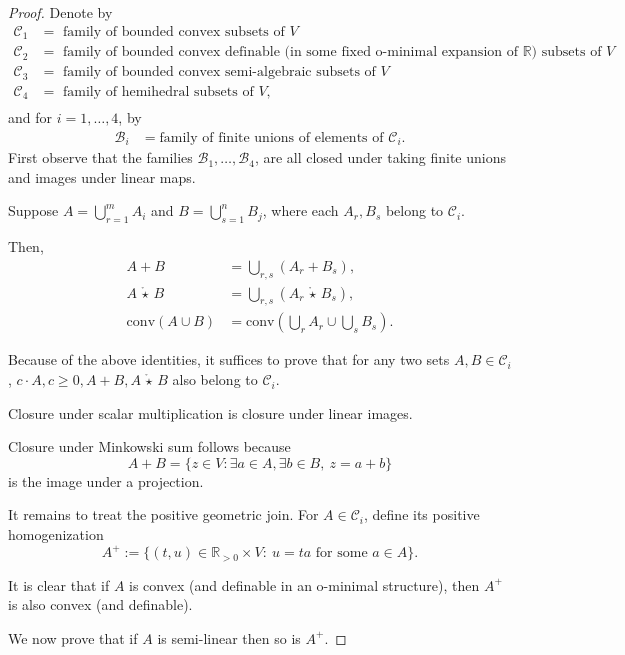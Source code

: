 \documentclass[10pt]{amsart}
\theoremstyle{plain}
\theoremstyle{definition}
\let\geq\geqslant
\providecommand{\cmult}[0]{\ensuremath{{\,\mathring{\star}\,}}\xspace}
\providecommand{\conv}[1]{\ensuremath{\mathrm{conv}{\left({#1}\right)}\xspace}}
\begin{document}
\begin{proof}
Denote by
\begin{align*}
\mathcal{C}_1 &= \text{ family of bounded convex subsets of $V$} \\
\mathcal{C}_2 &= \text{ family of  bounded convex definable (in some fixed o-minimal expansion of $\mathbb{R}$) subsets of $V$} \\
\mathcal{C}_3 &= \text{ family of bounded convex semi-algebraic subsets of $V$} \\
\mathcal{C}_4 &= \text{ family of  hemihedral subsets of $V$}, \\
\end{align*}
and for $i=1,\ldots,4$, by
\begin{align*}
\mathcal{B}_i &= \text{family of finite unions of elements of $\mathcal{C}_i$}.
\end{align*}
First observe that the families 
$\mathcal{B}_1,\ldots, \mathcal{B}_4$, 
are all closed under taking finite unions and
images under linear maps.

Suppose $A =  \bigcup_{r=1}^{m} A_i$ and $B = \bigcup_{s=1}^n B_j$, where each
$A_r,B_s$ belong to $\mathcal{C}_i$.

Then, 
\begin{align*}
    A + B &= \bigcup_{r,s} (A_r+B_s), \\
    A \cmult B &= \bigcup_{r,s} (A_r \cmult B_s), \\ 
    \conv{A\cup B} &= \conv{\bigcup_{r} A_r \cup \bigcup_{s} B_s}.
\end{align*}

Because of the above identities, it suffices to prove that for any two sets $A, B \in \mathcal{C}_i$, 
$c \cdot A, c \geq 0, A+B, A \cmult B$ also belong to $\mathcal{C}_i$.

Closure under scalar multiplication is closure under linear images. 

Closure under Minkowski sum follows because
\[
A+B=\{z\in V:\exists a\in A,\exists b\in B,\ z=a+b\}
\]
is the image under a projection.

It remains to treat the positive geometric join. 
For $A \in \mathcal{C}_i$, define its positive homogenization
\[
A^+ :=
\{(t,u)\in \mathbb R_{>0}\times V:\ u=t a \text{ for some } a\in A\}.
\]



It is clear that if $A$ is convex (and definable in an o-minimal structure), then
$A^+$ is also convex (and definable).

We now prove that if $A$ is semi-linear then so is $A^+$.


\end{proof}
\end{document}
